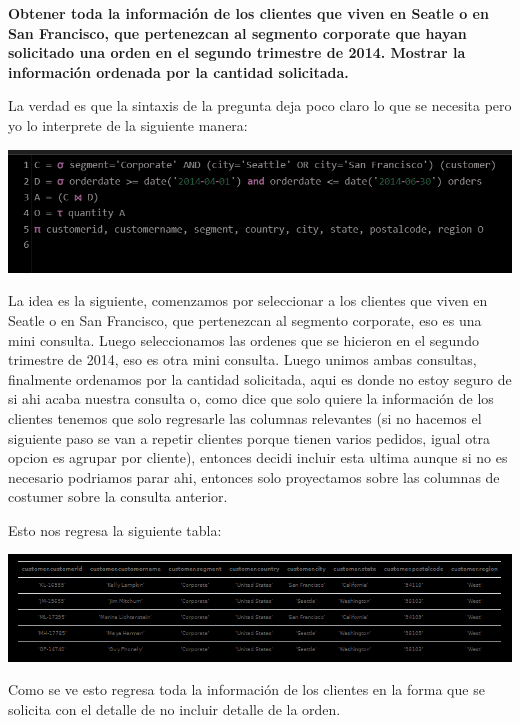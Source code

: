 \textbf{Obtener toda la información de los clientes que viven en Seatle o en San Francisco, que pertenezcan al segmento
corporate que hayan solicitado una orden en el segundo trimestre de 2014. Mostrar la información ordenada por la
cantidad solicitada.} \vspace{.3cm}

La verdad es que la sintaxis de la pregunta deja poco claro lo que se necesita pero yo lo interprete de la siguiente manera:

\begin{center}
    \includegraphics[width=14cm]{resources/pregunta2/2.1.1.png}
\end{center}

La idea es la siguiente, comenzamos por seleccionar a los clientes que viven en Seatle o en San Francisco, que pertenezcan al segmento corporate, eso es una mini consulta. Luego seleccionamos las ordenes que se hicieron en el segundo trimestre de 2014, eso es otra mini consulta. Luego unimos ambas consultas, finalmente ordenamos por la cantidad solicitada, aqui es donde no estoy seguro de si ahi acaba nuestra consulta o, como dice que solo quiere la información de los clientes tenemos que solo regresarle las columnas relevantes (si no hacemos el siguiente paso se van a repetir clientes porque tienen varios pedidos, igual otra opcion es agrupar por cliente), entonces decidi incluir esta ultima aunque si no es necesario podriamos parar ahi, entonces solo proyectamos sobre las columnas de costumer sobre la consulta anterior.

Esto nos regresa la siguiente tabla:

\begin{center}
    \includegraphics[width=14cm]{resources/pregunta2/2.1.2.png}
\end{center}

Como se ve esto regresa toda la información de los clientes en la forma que se solicita con el detalle de no incluir detalle de la orden.

\newpage